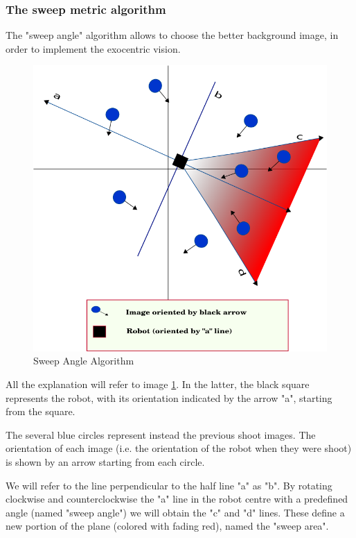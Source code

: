 \subsubsection{The sweep metric algorithm}
\label{subsec:sweep_metric_algorithm}
The "sweep angle" algorithm allows to choose the better background image, in order to implement
the exocentric vision.
%
\begin{figure}[!h]
  \begin{center}
    \includegraphics[width=400pt]{img/half_plan_finding.png} 
    \caption{Sweep Angle Algorithm}
    \label{fig:half_plan_finding}
  \end{center}
\end{figure}
%
All the explanation will refer to image \ref{fig:half_plan_finding}. In the latter, the black
square represents the robot, with its orientation indicated by the arrow "a", starting from the
square.
%

%
The several blue circles represent instead the previous shoot images. The orientation of each
image (i.e. the orientation of the robot when they were shoot) is shown by an arrow starting from
each circle.
%

%
We will refer to the line perpendicular to the half line "a" as "b". By rotating clockwise and
counterclockwise the "a" line in the robot centre with a predefined angle (named "sweep angle")
we will obtain the "c" and "d" lines. These define a new portion of the plane (colored with fading red),
named the "sweep area".
%

